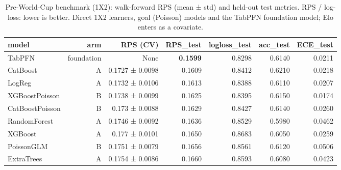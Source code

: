 \begin{table}[t]
  \centering
  \caption{Pre-World-Cup benchmark (1X2): walk-forward RPS (mean ± std) and held-out test metrics. RPS / log-loss: lower is better. Direct 1X2 learners, goal (Poisson) models and the TabPFN foundation model; Elo enters as a covariate.}
  \label{tab:benchmark}
  \begin{tabular}{lrrrrrr}
  \toprule
  model & arm & RPS (CV) & RPS\_test & logloss\_test & acc\_test & ECE\_test \\
  \midrule
  TabPFN & foundation & None & \textbf{0.1599} & 0.8298 & 0.6140 & 0.0211 \\
  CatBoost & A & 0.1727 ± 0.0098 & 0.1609 & 0.8412 & 0.6210 & 0.0218 \\
  LogReg & A & 0.1732 ± 0.0106 & 0.1613 & 0.8388 & 0.6110 & 0.0207 \\
  XGBoostPoisson & B & 0.1738 ± 0.0099 & 0.1625 & 0.8395 & 0.6150 & 0.0174 \\
  CatBoostPoisson & B & 0.173 ± 0.0088 & 0.1629 & 0.8427 & 0.6140 & 0.0260 \\
  RandomForest & A & 0.1746 ± 0.0092 & 0.1636 & 0.8529 & 0.5980 & 0.0462 \\
  XGBoost & A & 0.177 ± 0.0101 & 0.1650 & 0.8683 & 0.6050 & 0.0259 \\
  PoissonGLM & B & 0.1751 ± 0.0079 & 0.1656 & 0.8561 & 0.6120 & 0.0506 \\
  ExtraTrees & A & 0.1754 ± 0.0086 & 0.1660 & 0.8593 & 0.6080 & 0.0423 \\
  \bottomrule
  \end{tabular}
\end{table}
